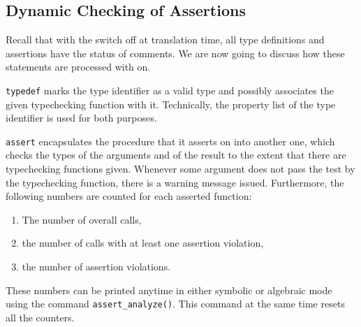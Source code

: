 \subsection{Dynamic Checking of Assertions}
Recall that with the switch  off at translation
time, all type definitions and assertions have the status of comments.
We are now going to discuss how these statements are processed with
 on.

\texttt{typedef} marks the type identifier as a valid type and possibly
associates the given typechecking function with it. Technically, the
property list of the type identifier is used for both purposes.

\texttt{assert} encapsulates the procedure that it asserts on into
another one, which checks the types of the arguments and of the result
to the extent that there are typechecking functions given. Whenever some
argument does not pass the test by the typechecking function, there is a
warning message issued. Furthermore, the following numbers are counted
for each asserted function:
\begin{enumerate}
\item The number of overall calls,
\item the number of calls with at least one assertion violation,
\item the number of assertion violations.
\end{enumerate}
These numbers can be printed anytime in either symbolic or algebraic
mode using the command \texttt{assert\_analyze()}. This command at the
same time resets all the counters.

